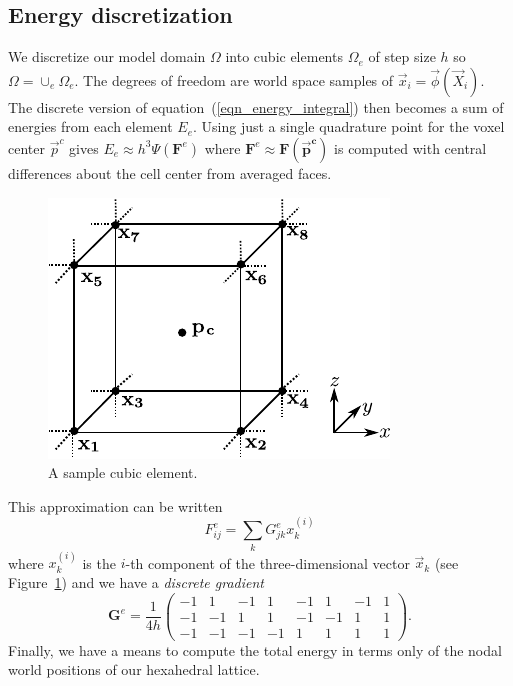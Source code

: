 \subsection{Energy discretization}

We discretize our model domain $\Omega$ into cubic elements $\Omega_e$ of step size $h$ so $\Omega=\cup_e\Omega_e$. The degrees of freedom are world space samples of
$\vec{x}_i=\vec{\phi}(\vec{X}_i)$. The discrete version of
equation~(\ref{eqn_energy_integral}) then becomes a sum of energies from each element $E_e$.  Using just a single quadrature point for the voxel center $\vec{p}^c$ gives $E_e \approx h^3\Psi(\mathbf{F}^e)$ where $\mathbf{F}^e\approx\mathbf{F(\vec{p}^c)}$ is computed with central differences about the cell center from averaged faces.
\begin{figure}
\centering
\includegraphics[width=.35\columnwidth]{elasticity/figures/grid.pdf}
\caption{A sample cubic element.}\label{fig:cubic_element}
\end{figure}
 This approximation can be written
\begin{equation}
F_{ij}^e=\sum_kG_{jk}^ex_k^{(i)}
\label{eqn_discrete_gradient}
\end{equation}
where $x_k^{(i)}$ is the $i$-th component of the three-dimensional vector $\vec{x}_k$ (see Figure~\ref{fig:cubic_element}) and we have
a \emph{discrete gradient}
{\small$$
\mathbf{G}^e=
\frac{1}{4h}
\left(
\begin{array}{cccccccc}
-1 &  1 & -1 &  1 & -1 &  1 & -1 &  1 \\
-1 & -1 &  1 &  1 & -1 & -1 &  1 &  1 \\
-1 & -1 & -1 & -1 &  1 &  1 &  1 &  1
\end{array}
\right).
$$}
Finally, we have a means to compute the total energy in terms only of the nodal world positions of our hexahedral lattice.



